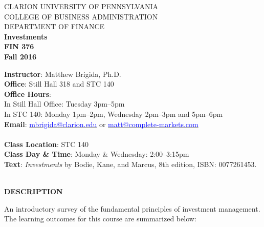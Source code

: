 \documentclass{article}
\begin{document}
\begin{center}
CLARION UNIVERSITY OF PENNSYLVANIA\\
COLLEGE OF BUSINESS ADMINISTRATION\\
DEPARTMENT OF FINANCE
\\
{\bf Investments}\\
{\bf FIN 376}\\
{\bf Fall 2016}\\
\end{center}
\vspace*{5pt}
{\bf Instructor}: Matthew Brigida, Ph.D. \\
{\bf Office}: Still Hall 318 and STC 140\\
{\bf Office Hours}: \\
In Still Hall Office: Tuesday 3pm--5pm \\
In STC 140: Monday 1pm--2pm, Wednesday 2pm--3pm and 5pm--6pm\\
{\bf Email}: 
\href{mailto:mbrigida@clarion.edu}{\textcolor{blue}{mbrigida@clarion.edu}} or \href{mailto:matt@complete-markets.com}{\textcolor{blue}{matt@complete-markets.com}} \\
\\
{\bf Class Location}:  STC 140\\
{\bf Class Day \& Time}: Monday \& Wednesday: 2:00--3:15pm
\\
{\bf Text}: {\it Investments} by Bodie, Kane, and Marcus, 8th edition, ISBN: 0077261453.
\\
\\
\begin{center}
{\bf DESCRIPTION}
\end{center}  
An introductory survey of the fundamental principles of investment management.
The learning outcomes for this course are summarized below:
\end{document}
